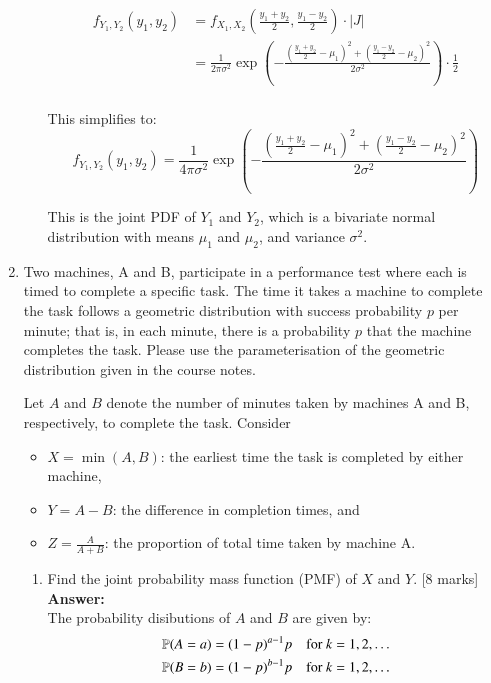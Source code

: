 \documentclass[12pt]{article}
\begin{document}
\begin{enumerate}
\begin{enumerate}
\begin{align*}
f_{Y_1, Y_2}(y_1, y_2) &= f_{X_1, X_2}\left(\frac{y_1 + y_2}{2}, \frac{y_1 - y_2}{2}\right) \cdot \left|J\right| \\
&= \frac{1}{2\pi \sigma^2} \exp\left(-\frac{\left(\frac{y_1 + y_2}{2} - \mu_1\right)^2 + \left(\frac{y_1 - y_2}{2} - \mu_2\right)^2}{2\sigma^2}\right) \cdot \frac{1}{2} \\
\end{align*}

This simplifies to:
\[
\boxed{f_{Y_1, Y_2}(y_1, y_2) = \frac{1}{4\pi \sigma^2} \exp\left(-\frac{\left(\frac{y_1 + y_2}{2} - \mu_1\right)^2 + \left(\frac{y_1 - y_2}{2} - \mu_2\right)^2}{2\sigma^2}\right)}
\]

This is the joint PDF of $Y_1$ and $Y_2$, which is a bivariate normal distribution with means $\mu_1$ and $\mu_2$, and variance $\sigma^2$.
%

\end{enumerate}

\vspace{5pt}
\item 
Two machines, A and B, participate in a performance test where each is timed to complete a specific task. The time it takes a machine to complete the task follows a geometric distribution with success probability $p$ per minute; that is, in each minute, there is a probability $p$ that the machine completes the task. Please use the parameterisation of the geometric distribution given in the course notes.  

Let $A$ and $B$ denote the number of minutes taken by machines A and B, respectively, to complete the task. Consider
\begin{itemize}
\item $X=\min(A, B)$: the earliest time the task is completed by either machine,
\item $Y = A-B$: the difference in completion times, and 
\item $Z = \frac{A}{A+B}$: the proportion of total time taken by machine A.
\end{itemize}
 
\begin{enumerate}
\item Find the joint probability mass function (PMF) of $X$ and $Y$. 
			\hfill [8 marks]
%
\\
\textbf{Answer:}
\\
The probability disibutions of $A$ and $B$ are given by:
\begin{align*}
{\mathbb P}(A=a) &= (1-p)^{a-1}p \quad \text{for } k=1,2,\ldots \\
{\mathbb P}(B=b) &= (1-p)^{b-1}p \quad \text{for } k=1,2,\ldots
\end{align*}


\end{enumerate}
\end{enumerate}
\end{document}
